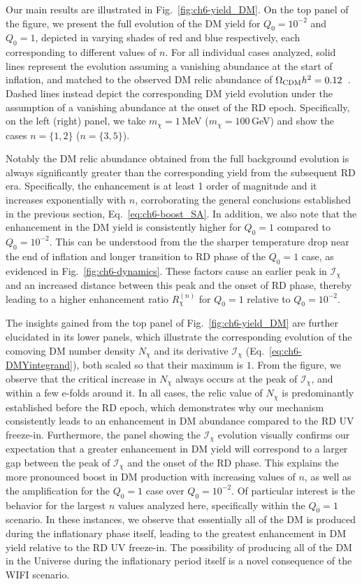 Our main results are illustrated in Fig.~\ref{fig:ch6-yield_DM}. On the top panel of the figure, we present the full evolution of the DM yield for $Q_0=10^{-2}$ and $Q_0=1$, depicted in varying shades of red and blue respectively, each corresponding to different values of $n$. For all individual cases analyzed, solid lines represent the evolution assuming a vanishing abundance at the start of inflation, and matched to the observed DM relic abundance of $\Omega_{\rm{CDM}}h^2=0.12$~\cite{Planck:2018vyg}. Dashed lines instead depict the corresponding DM yield evolution under the assumption of a vanishing abundance at the onset of the RD epoch. Specifically, on the left (right) panel, we take $m_\chi=1\,$MeV ($m_\chi=100\,$GeV) and show the cases $n=\{1,2\}$ ($n=\{3,5\}$).

Notably the DM relic abundance obtained from the full background evolution
is always significantly greater than the corresponding yield from the subsequent RD era. Specifically, the enhancement is at least 1 order of magnitude and it increases exponentially with $n$, corroborating  the general conclusions established in the previous section,  Eq.~\eqref{eq:ch6-boost_SA}.  In addition, we also note that the enhancement in the DM yield is consistently higher for $Q_0=1$ compared to $Q_0=10^{-2}$. This can be understood from the the sharper temperature drop near the end of inflation and longer transition to RD phase of the $Q_0=1$ case, as evidenced in Fig.~\ref{fig:ch6-dynamics}. These factors cause an earlier peak in $\mathcal{I}_\chi$ and an increased distance between this peak and the onset of RD phase, thereby leading to a higher enhancement ratio $R^{(n)}_\chi$ for $Q_0=1$ relative to $Q_0=10^{-2}$.


The insights gained from the top panel of Fig.~\ref{fig:ch6-yield_DM} are further elucidated in its lower panels, which illustrate the corresponding evolution of the comoving DM number density $N_\chi$ and its derivative $\mathcal{I}_\chi$ (Eq.~\eqref{eq:ch6-DMYintegrand}), both scaled so that their maximum is $1$. From the figure, we observe that the critical increase in $N_\chi$ always occurs at the peak of $\mathcal{I}_\chi$,  and within a few e-folds around it. In all cases, the relic value of $N_\chi$ is predominantly established before the RD epoch,  which demonstrates why our mechanism consistently leads to an enhancement in DM abundance compared to the RD UV freeze-in. Furthermore, the panel showing the $\mathcal{I}_\chi$ evolution visually confirms our expectation that a greater enhancement in DM yield will correspond to a larger gap between the peak of $\mathcal{I}_\chi$ and the onset of the RD phase. This explains the more pronounced boost in DM production with increasing values of $n$, as well as the amplification for the $Q_0=1$ case over $Q_0=10^{-2}$. Of particular interest is the behavior for the largest  $n$ values analyzed here, specifically within the $Q_0=1$ scenario. In these instances, we observe that essentially all of the DM is produced during the inflationary phase itself, leading to the greatest enhancement in DM yield relative to the RD UV freeze-in.  The possibility of producing all of the DM in the Universe during the inflationary period itself is a novel consequence of the WIFI scenario.

